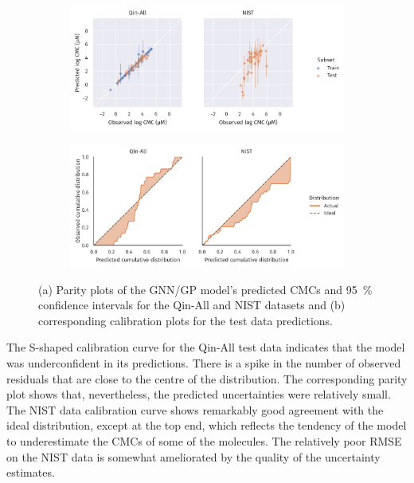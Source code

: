\begin{figure}
    \centering
    \begin{subfigure}{\textwidth}
        \includegraphics[width=\textwidth]{images/uq-parity.pdf}
        \caption{}
        \label{fig:uq-parity}
    \end{subfigure}
    \begin{subfigure}{\textwidth}
        \includegraphics[width=\textwidth]{images/uq-calibration.pdf}
        \caption{}
        \label{fig:uq-calibration}
    \end{subfigure}
    \caption{(a) Parity plots of the GNN/GP model's predicted CMCs and \SI{95}{\%}
        confidence intervals for the Qin-All and NIST datasets and (b) corresponding
        calibration plots for the test data predictions.}
\end{figure}

The S-shaped calibration curve for the Qin-All test data indicates that the model was underconfident in its predictions. There is a spike in the number of observed residuals that are close to the centre of the distribution. The corresponding parity plot shows that, nevertheless, the predicted uncertainties were relatively small. The NIST data calibration curve shows remarkably good
agreement with the ideal distribution, except at the top end, which reflects the tendency of the model to underestimate the CMCs of some of the molecules. The relatively poor RMSE on the NIST data is somewhat ameliorated by the quality of
the uncertainty estimates.

